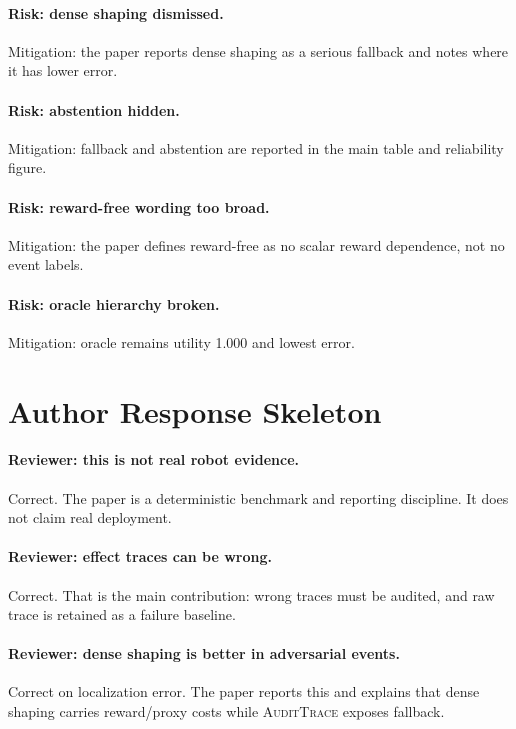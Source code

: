 \documentclass{article}
\newcommand{\method}{\textsc{AuditTrace}\xspace}
\begin{document}
\paragraph{Risk: dense shaping dismissed.}
Mitigation: the paper reports dense shaping as a serious fallback and notes where it has lower error.

\paragraph{Risk: abstention hidden.}
Mitigation: fallback and abstention are reported in the main table and reliability figure.

\paragraph{Risk: reward-free wording too broad.}
Mitigation: the paper defines reward-free as no scalar reward dependence, not no event labels.

\paragraph{Risk: oracle hierarchy broken.}
Mitigation: oracle remains utility 1.000 and lowest error.

\section{Author Response Skeleton}

\paragraph{Reviewer: this is not real robot evidence.}
Correct. The paper is a deterministic benchmark and reporting discipline. It does not claim real deployment.

\paragraph{Reviewer: effect traces can be wrong.}
Correct. That is the main contribution: wrong traces must be audited, and raw trace is retained as a failure baseline.

\paragraph{Reviewer: dense shaping is better in adversarial events.}
Correct on localization error. The paper reports this and explains that dense shaping carries reward/proxy costs while \method exposes fallback.
\end{document}
